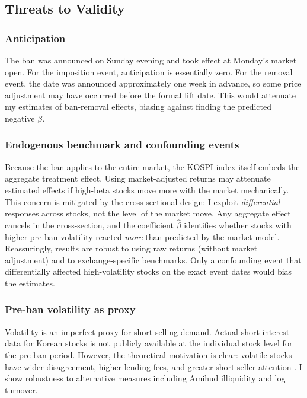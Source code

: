 \documentclass[12pt]{article}
\begin{document}
\subsection{Threats to Validity}

\subsubsection*{Anticipation} The ban was announced on Sunday evening and took effect at Monday's market open. For the imposition event, anticipation is essentially zero. For the removal event, the date was announced approximately one week in advance, so some price adjustment may have occurred before the formal lift date. This would attenuate my estimates of ban-removal effects, biasing against finding the predicted negative $\beta$.

\subsubsection*{Endogenous benchmark and confounding events} Because the ban applies to the entire market, the KOSPI index itself embeds the aggregate treatment effect. Using market-adjusted returns may attenuate estimated effects if high-beta stocks move more with the market mechanically. This concern is mitigated by the cross-sectional design: I exploit \textit{differential} responses across stocks, not the level of the market move. Any aggregate effect cancels in the cross-section, and the coefficient $\hat{\beta}$ identifies whether stocks with higher pre-ban volatility reacted \textit{more} than predicted by the market model. Reassuringly, results are robust to using raw returns (without market adjustment) and to exchange-specific benchmarks. Only a confounding event that differentially affected high-volatility stocks on the exact event dates would bias the estimates.

\subsubsection*{Pre-ban volatility as proxy} Volatility is an imperfect proxy for short-selling demand. Actual short interest data for Korean stocks is not publicly available at the individual stock level for the pre-ban period. However, the theoretical motivation is clear: volatile stocks have wider disagreement, higher lending fees, and greater short-seller attention \citep{dechow2001short, hong2003differences}. I show robustness to alternative measures including Amihud illiquidity and log turnover.
\end{document}
